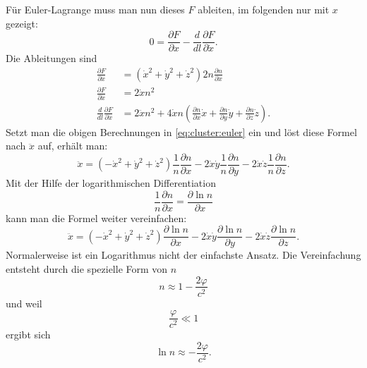\begin{refsection}
Für Euler-Lagrange muss man nun dieses \(F\) ableiten, im folgenden
nur mit \(x\) gezeigt:
\begin{equation}
  \label{eq:cluster:euler}
  0 = \frac{\partial F}{\partial x} - \frac{d}{d l} \frac{\partial
    F}{\partial \dot{x}}.
\end{equation}
Die Ableitungen sind
\begin{align*}
  \frac{\partial F}{\partial x} &= (\dot{x}^2+\dot{y}^2+\dot{z}^2) 2n
                                  \frac{\partial n}{\partial x}\\
  \frac{\partial F}{\partial\dot{x}} &= 2\dot{x}n^2\\
  \frac{d}{d l}\frac{\partial F}{\partial\dot{x}} &= 2\ddot{x}n^2 + 4\dot{x}n
                                \left(\frac{\partial n}{\partial x}\dot{x} +
                                \frac{\partial n}{\partial y}\dot{y} +
                                \frac{\partial n}{\partial z}\dot{z} \right).
\end{align*}
Setzt man die obigen Berechnungen in \ref{eq:cluster:euler} ein und
löst diese Formel nach \(\ddot{x}\) auf, erhält man:
\begin{equation}
  \ddot{x} = (-\dot{x}^2+\dot{y}^2+\dot{z}^2)
  \frac{1}{n}\frac{\partial n}{\partial x} -
  2\dot{x}\dot{y} \frac{1}{n}\frac{\partial n}{\partial y} -
  2\dot{x}\dot{z} \frac{1}{n}\frac{\partial n}{\partial z}.
\end{equation}
Mit der Hilfe der logarithmischen Differentiation
%
%
\begin{equation*}
  \frac{1}{n} \frac{\partial n}{\partial x} = \frac{\partial \ln
    n}{\partial x}
\end{equation*}
kann man die Formel weiter vereinfachen:
\begin{equation}
  \ddot{x} = (-\dot{x}^2+\dot{y}^2+\dot{z}^2) \frac{\partial \ln
    n}{\partial x} - 2\dot{x}\dot{y} \frac{\partial \ln n}{\partial y}
  - 2\dot{x}\dot{z} \frac{\partial \ln n}{\partial z}.
\end{equation}
Normalerweise ist ein Logarithmus nicht der einfachste Ansatz.  Die
Vereinfachung entsteht durch die spezielle Form von \(n\)
\begin{equation*}
  n \approx 1-\frac{2\varphi}{c^2}
\end{equation*}
und weil
\begin{equation*}
  \frac{\varphi}{c^2} \ll 1
\end{equation*}
ergibt sich
\begin{equation*}
  \ln n \approx -\frac{2\varphi}{c^2}.
\end{equation*}


\end{refsection}
